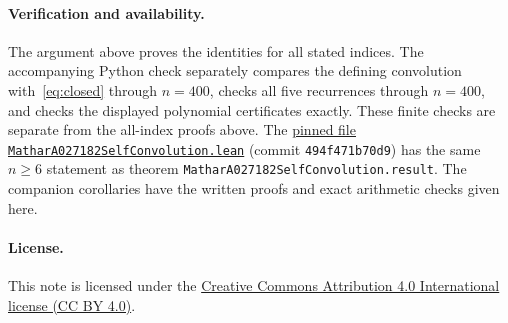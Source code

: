 \documentclass[11pt]{article}
\begin{document}
\paragraph{Verification and availability.}
The argument above proves the identities for all stated indices.
The accompanying Python check separately compares the defining convolution
with~\eqref{eq:closed} through $n=400$, checks all five recurrences
through $n=400$, and checks the displayed polynomial certificates exactly.
These finite checks are separate from the all-index proofs above. The
\href{https://github.com/the-omega-institute/trureturing/blob/494f471b70d9470db92b4dbc07a309d78ca59ec7/D5/S1/Recurrence/MatharA027182SelfConvolution.lean}{pinned file \texttt{MatharA027182SelfConvolution.lean}}
(commit \texttt{494f471b70d9}) has the same $n\geq6$ statement as theorem
\texttt{MatharA027182SelfConvolution.result}.
The companion corollaries have the written proofs and exact arithmetic
checks given here.

\paragraph{License.}
This note is licensed under the
\href{https://creativecommons.org/licenses/by/4.0/}{Creative Commons Attribution 4.0 International license (CC BY 4.0)}.
\end{document}
